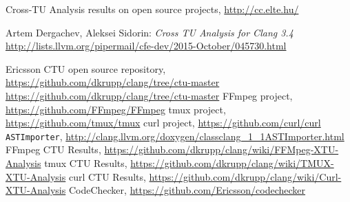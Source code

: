 \documentclass{article}
\begin{document}
\begin{thebibliography}{9}
 Cross-TU Analysis results on open source projects, \url{http://cc.elte.hu/}

 Artem Dergachev, Aleksei Sidorin: \emph{Cross TU Analysis for Clang 3.4}
  \url{http://lists.llvm.org/pipermail/cfe-dev/2015-October/045730.html}

 Ericsson CTU open source repository, \url{https://github.com/dkrupp/clang/tree/ctu-master}
 \url{https://github.com/dkrupp/clang/tree/ctu-master}
 FFmpeg project, \url{https://github.com/FFmpeg/FFmpeg}
 tmux project, \url{https://github.com/tmux/tmux}
 curl project, \url{https://github.com/curl/curl}
 \texttt{ASTImporter}, \url{http://clang.llvm.org/doxygen/classclang_1_1ASTImporter.html}
 FFmpeg CTU Results, {\small \url{https://github.com/dkrupp/clang/wiki/FFMpeg-XTU-Analysis}}
 tmux CTU Results, \url{https://github.com/dkrupp/clang/wiki/TMUX-XTU-Analysis}
 curl CTU Results, \url{https://github.com/dkrupp/clang/wiki/Curl-XTU-Analysis}
 CodeChecker, \url{https://github.com/Ericsson/codechecker}
\end{thebibliography}
\end{document}
